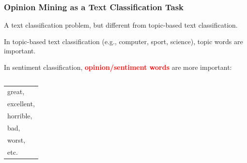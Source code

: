 \documentclass[t]{beamer}
\begin{document}
\begin{frame} \frametitle{Opinion Mining as a Text Classification Task} %
 

A text classification problem, but different from topic-based text
classification. 

In topic-based text classification (e.g., computer, sport, science),
topic words are important. 

\vfill

In sentiment classification, \textcolor{red}{{\bf opinion/sentiment words}} are more
important: 

\begin{columns}

\begin{column}{0.5 \textwidth}

\begin{center}
\begin{tabular}{l}
great, \\
excellent, \\
horrible, \\
bad, \\
worst, \\
etc. 
\end{tabular}
\end{center}

\end{column}

\begin{column}{0.5 \textwidth}


\end{column}
\end{columns}


\end{frame} 
\end{document}
